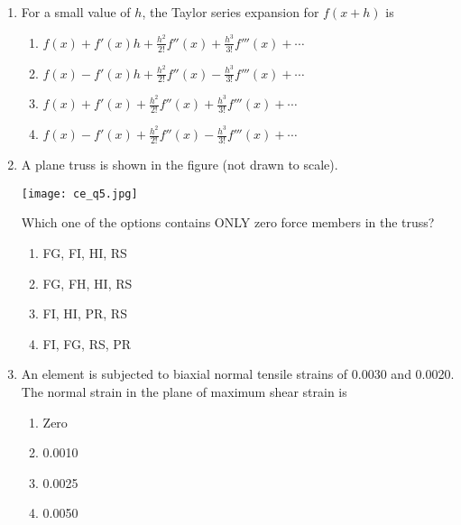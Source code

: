 \documentclass[12pt]{article}
\begin{document}
\begin{enumerate}[label=Q.\arabic*]
	\item For a small value of $h$, the Taylor series expansion for $f(x+h)$ is
		\begin{enumerate}[label=(\Alph*)]
			\item $f(x) + f'(x)h + \frac{h^2}{2!} f''(x) + \frac{h^3}{3!} f'''(x) + \cdots$ 
			\item $f(x) - f'(x)h + \frac{h^2}{2!} f''(x) - \frac{h^3}{3!} f'''(x) + \cdots$ 
			\item $f(x) + f'(x) + \frac{h^2}{2!} f''(x) + \frac{h^3}{3!} f'''(x) + \cdots$ 
			\item $f(x) - f'(x) + \frac{h^2}{2!} f''(x) - \frac{h^3}{3!} f'''(x) + \cdots$
		\end{enumerate}
	\item A plane truss is shown in the figure (not drawn to scale).  
		\begin{center}
			\texttt{[image: ce\_q5.jpg]}
		\end{center}
		Which one of the options contains ONLY zero force members in the truss?
		\begin{multicols}{2}
			\begin{enumerate}[label=(\Alph*)]
				\item FG, FI, HI, RS  
				\item FG, FH, HI, RS  
				\item FI, HI, PR, RS  
				\item FI, FG, RS, PR  
			\end{enumerate}
		\end{multicols}

	\item An element is subjected to biaxial normal tensile strains of 0.0030 and 0.0020. The normal strain in the plane of maximum shear strain is  
		\begin{enumerate}[label=(\Alph*)]
			\item Zero  
			\item 0.0010  
			\item 0.0025  
			\item 0.0050  
		\end{enumerate}


\end{enumerate}
\end{document}
